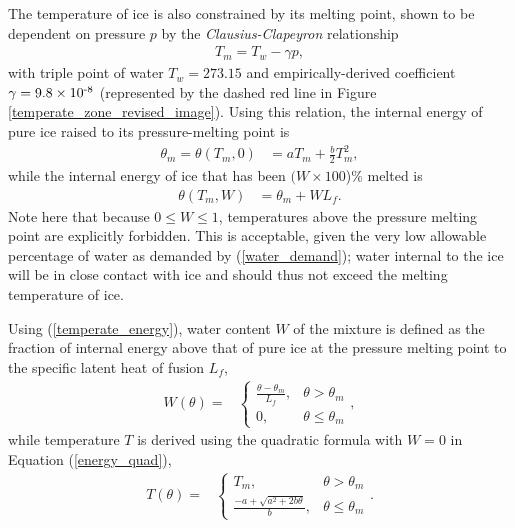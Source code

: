 The temperature of ice is also constrained by its melting point, shown to be dependent on pressure $p$ by the  \emph{Clausius-Clapeyron} relationship \citep{paterson_1994}
\begin{align}
  \label{temperature_melting}
  T_m = T_w - \gamma p,
\end{align} 
with triple point of water $T_w = 273.15$ and empirically-derived coefficient $\gamma = 9.8 \times 10^{\textrm{-8}}$ (represented by the dashed red line in Figure \ref{temperate_zone_revised_image}).  Using this relation, the internal energy of pure ice raised to its pressure-melting point is
\begin{align}
  \label{energy_melting}
  \theta_m = \theta(T_m,0) &= a T_m + \frac{b}{2} T_m^2,
\end{align}
while the internal energy of ice that has been $(W \times 100$)\% melted is
\begin{align}
  \label{temperate_energy}
  \theta(T_m,W) &= \theta_m + W L_f.
\end{align}
Note here that because $0 \leq W \leq 1$, temperatures above the pressure melting point are explicitly forbidden.  This is acceptable, given the very low allowable percentage of water as demanded by (\ref{water_demand}); water internal to the ice will be in close contact with ice and should thus not exceed the melting temperature of ice.

Using (\ref{temperate_energy}), water content $W$ of the mixture is defined as the fraction of internal energy above that of pure ice at the pressure melting point to the specific latent heat of fusion $L_f$,
\begin{align}
  \label{water_content}
  W(\theta) = &\left\{%
    \begin{array}{ll}
      \frac{\theta - \theta_m}{L_f}, & \theta > \theta_m \\
      0,                             & \theta \leq \theta_m
    \end{array} \right. ,
\end{align}
while temperature $T$ is derived using the quadratic formula with $W=0$ in Equation (\ref{energy_quad}),
\begin{align}
  \label{temperature}
  T(\theta) = &\left\{%
    \begin{array}{ll}
      T_m,                                               & \theta > \theta_m \\
      \frac{-a + \sqrt{a^2 + 2b \theta}}{b}, & \theta \leq \theta_m
    \end{array} \right. .
\end{align}

